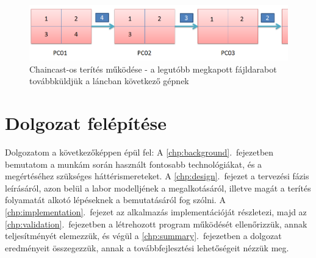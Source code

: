 \begin{figure}[ht]
\centering
\includegraphics[width=140mm, keepaspectratio]{figures/chaincast.png}
\caption{Chaincast-os terítés működése - a legutóbb megkapott fájldarabot továbbküldjük a láncban következő gépnek}
\label{fig:chaincast}
\end{figure}

\section{Dolgozat felépítése}

Dolgozatom a következőképpen épül fel:
A \ref{chp:background}.~fejezetben bemutatom a munkám során használt fontosabb technológiákat, és a megértéséhez szükséges háttérismereteket. A \ref{chp:design}.~fejezet a tervezési fázis leírásáról, azon belül a labor modelljének a megalkotásáról, illetve magát a terítés folyamatát alkotó lépéseknek a bemutatásáról fog szólni. A \ref{chp:implementation}.~fejezet az alkalmazás implementációját részletezi, majd az \ref{chp:validation}.~fejezetben a létrehozott program működését ellenőrizzük, annak teljesítményét elemezzük, és végül a \ref{chp:summary}.~fejezetben a dolgozat eredményeit összegezzük, annak a továbbfejlesztési lehetőségeit nézzük meg.
